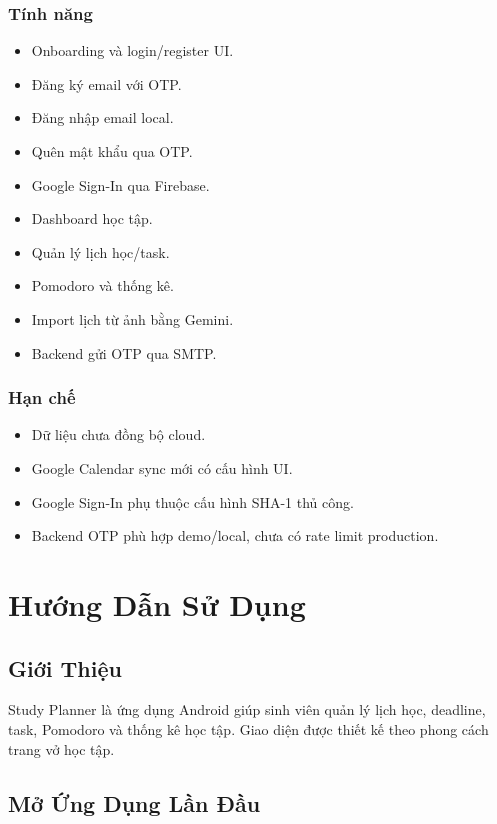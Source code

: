 \documentclass[12pt,a4paper]{report}
\begin{document}
\subsection{Tính năng}

\begin{itemize}
\item Onboarding và login/register UI.
\item Đăng ký email với OTP.
\item Đăng nhập email local.
\item Quên mật khẩu qua OTP.
\item Google Sign-In qua Firebase.
\item Dashboard học tập.
\item Quản lý lịch học/task.
\item Pomodoro và thống kê.
\item Import lịch từ ảnh bằng Gemini.
\item Backend gửi OTP qua SMTP.
\end{itemize}

\subsection{Hạn chế}

\begin{itemize}
\item Dữ liệu chưa đồng bộ cloud.
\item Google Calendar sync mới có cấu hình UI.
\item Google Sign-In phụ thuộc cấu hình SHA-1 thủ công.
\item Backend OTP phù hợp demo/local, chưa có rate limit production.
\end{itemize}
\clearpage
\chapter{Hướng Dẫn Sử Dụng}

\section{Giới Thiệu}

Study Planner là ứng dụng Android giúp sinh viên quản lý lịch học, deadline, task, Pomodoro và thống kê học tập. Giao diện được thiết kế theo phong cách trang vở học tập.

\section{Mở Ứng Dụng Lần Đầu}
\end{document}
